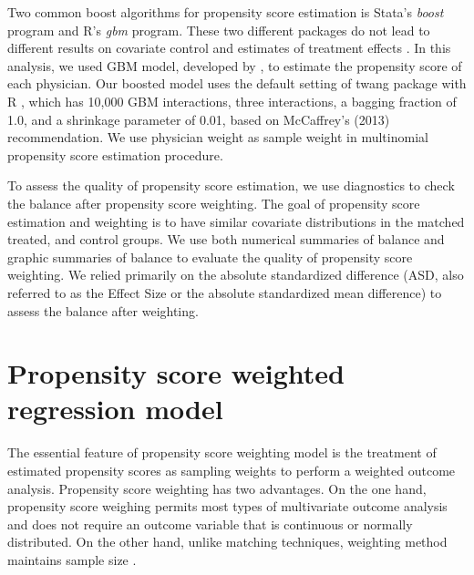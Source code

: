 \documentclass[12pt]{report}
\begin{document}
Two common boost algorithms for propensity score estimation is Stata's \textit{boost} program and R's \textit{gbm} program. These two different packages do not lead to different results on covariate control and estimates of treatment effects \citep{guo2014propensity}. In this analysis, we used GBM model, developed by  \citep{mccaffrey2004propensity}, to estimate the propensity score of each physician. Our boosted model uses the default setting of twang package \citep{mccaffrey2013tutorial} with R \citep{rbase}, which has 10,000 GBM interactions, three interactions, a bagging fraction of 1.0, and a shrinkage parameter of 0.01, based on McCaffrey's (2013) recommendation. We use physician weight as sample weight in multinomial propensity score estimation procedure.

To assess the quality of propensity score estimation, we use diagnostics to check the balance after propensity score weighting. The goal of propensity score estimation and weighting is to have similar covariate distributions in the matched treated, and control groups. We use both numerical summaries of balance and graphic summaries of balance to evaluate the quality of propensity score weighting. We relied primarily on the absolute standardized difference (ASD, also referred to as the Effect Size or the absolute standardized mean difference) to assess the balance after weighting. 

\section{Propensity score weighted regression model}
The essential feature of propensity score weighting model is the treatment of estimated propensity scores as sampling weights to perform a weighted outcome analysis. Propensity score weighting has two advantages. On the one hand, propensity score weighing permits most types of multivariate outcome analysis and does not require an outcome variable that is continuous or normally distributed. On the other hand, unlike matching techniques, weighting method maintains sample size \citep{guo2014propensity}.
\end{document}

